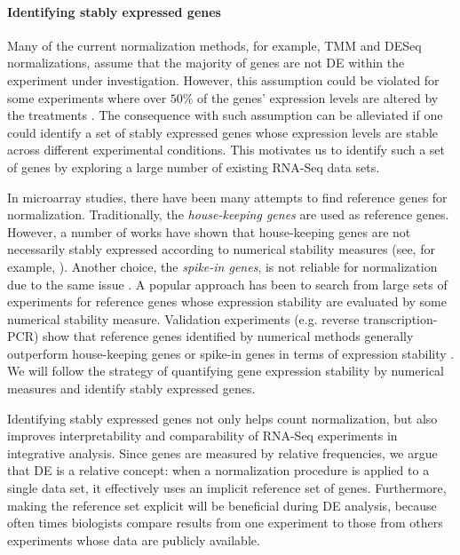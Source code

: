 \paragraph{Identifying stably expressed genes}
Many of the current normalization methods, for example, TMM \citep{robinson2010scaling} and DESeq
\citep{anders2010differential} normalizations, assume that the majority of genes are not DE within
the experiment under investigation. However, this assumption could be violated for some experiments
where over $50\%$ of the genes' expression levels are altered by the treatments
\citep{loven2012revisiting, wu2013use}. The consequence with such assumption can be alleviated if
one could identify a set of stably expressed genes whose expression levels are stable across
different experimental conditions. This motivates us to identify such a set of genes by exploring a
large number of existing RNA-Seq data sets.

In microarray studies, there have been many attempts to find reference genes for normalization.
Traditionally, the \textit{house-keeping genes}  are used as reference genes.
However, a number of works have shown that house-keeping genes are not necessarily stably expressed
according to numerical stability measures (see, for example,
\cite{czechowski2005genome,huggett2005real}). Another choice, the \textit{spike-in genes}, is not
reliable for normalization due to the same issue \citep{risso2014nat}. A popular approach has been
to search from large sets of experiments for reference genes
\citep{czechowski2005genome,dekkers2012identification,frericks2008toolbox,gur2009identification,stamova2009identification}
whose expression stability are evaluated by some numerical stability measure. Validation experiments (e.g. reverse
transcription-PCR) show that reference genes identified by numerical methods generally outperform house-keeping genes or spike-in genes in terms of expression stability \citep{czechowski2005genome,hruz2011refgenes}.
We will follow the strategy of quantifying gene expression stability by numerical measures and
identify stably expressed genes.

Identifying stably expressed genes not only helps count normalization, but also improves
interpretability and comparability of RNA-Seq experiments in integrative analysis. Since genes are
measured by relative frequencies, we argue that DE is a relative concept: when a normalization
procedure is applied to a single data set, it effectively uses an implicit reference set of genes.
Furthermore, making the reference set explicit will be beneficial during DE analysis, because often times biologists compare results from one experiment to those from others experiments whose data are publicly
available. 


